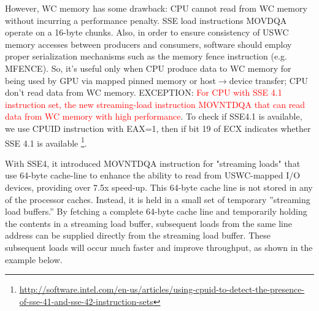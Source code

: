 However, WC memory has some drawback: CPU cannot read from WC memory without
incurring a performance penalty. SSE load instructions MOVDQA operate on a
16-byte chunks. Also, in order to ensure consistency of USWC memory accesses
between producers and consumers, software should employ proper serialization
mechanisms such as the memory fence instruction (e.g. MFENCE).
So, it's useful only when CPU produce data to WC memory for being used by GPU
via mapped pinned memory or host$\rightarrow$device transfer; CPU don't read
data from WC memory.
EXCEPTION:
\textcolor{red}{For CPU with SSE 4.1 instruction set, the new streaming-load
instruction MOVNTDQA that can read data from WC memory with high performance}.
To check if SSE4.1 is available, we use CPUID instruction with EAX=1, then if
bit 19 of ECX indicates whether SSE 4.1 is available
\footnote{\url{http://software.intel.com/en-us/articles/using-cpuid-to-detect-the-presence-of-sse-41-and-sse-42-instruction-sets}}.


With SSE4, it introduced MOVNTDQA instruction for "streaming loads" that use
64-byte cache-line to enhance the ability to read from USWC-mapped I/O devices,
providing over 7.5x speed-up. This 64-byte cache line is not stored in any of
the processor caches. Instead, it is held in a small set of temporary
''streaming load buffers.'' By fetching a complete 64-byte cache line and
temporarily holding the contents in a streaming load buffer, subsequent loads
from the same line address can be supplied directly from the streaming load
buffer. These subsequent loads will occur much faster and improve throughput, as
shown in the example below.





